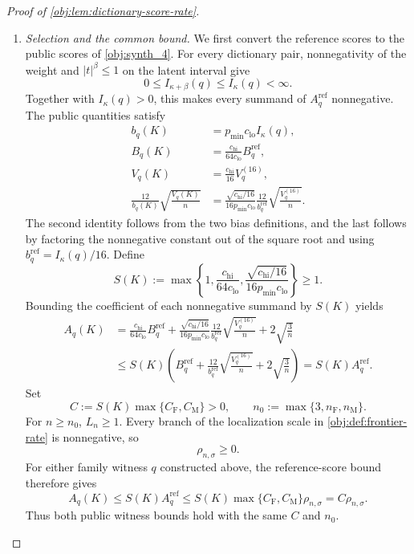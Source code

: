 \begin{proof}[Proof of \cref{obj:lem:dictionary-score-rate}]
\begin{enumerate}
\item \emph{Selection and the common bound.}
We first convert the reference scores to the public scores of \cref{obj:synth_4}. For every dictionary pair, nonnegativity of the weight and \(|t|^\beta\le1\) on the latent interval give
\[
0\le I_{\kappa+\beta}(q)\le I_\kappa(q)<\infty.
\]
Together with \(I_\kappa(q)>0\), this makes every summand of \(A_q^{\mathrm{ref}}\) nonnegative. The public quantities satisfy
\[
\begin{aligned}
b_q(K)&=p_{\min}c_{\mathrm{lo}}I_\kappa(q),\\
B_q(K)&=\frac{c_{\mathrm{hi}}}{64c_{\mathrm{lo}}}B_q^{\mathrm{ref}},\\
V_q(K)&=\frac{c_{\mathrm{hi}}}{16}V_q^{(16)},\\
\frac{12}{b_q(K)}\sqrt{\frac{V_q(K)}n}
&=\frac{\sqrt{c_{\mathrm{hi}}/16}}{16p_{\min}c_{\mathrm{lo}}}
\frac{12}{b_q^{\mathrm{ref}}}\sqrt{\frac{V_q^{(16)}}n}.
\end{aligned}
\]
The second identity follows from the two bias definitions, and the last follows by factoring the nonnegative constant out of the square root and using \(b_q^{\mathrm{ref}}=I_\kappa(q)/16\). Define
\[
S(K):=\max\left\{1,\frac{c_{\mathrm{hi}}}{64c_{\mathrm{lo}}},
\frac{\sqrt{c_{\mathrm{hi}}/16}}{16p_{\min}c_{\mathrm{lo}}}\right\}\ge1.
\]
Bounding the coefficient of each nonnegative summand by \(S(K)\) yields
\[
\begin{aligned}
A_q(K)
&=\frac{c_{\mathrm{hi}}}{64c_{\mathrm{lo}}}B_q^{\mathrm{ref}}
+\frac{\sqrt{c_{\mathrm{hi}}/16}}{16p_{\min}c_{\mathrm{lo}}}
\frac{12}{b_q^{\mathrm{ref}}}\sqrt{\frac{V_q^{(16)}}n}
+2\sqrt{\frac3n}\\
&\le S(K)\left(B_q^{\mathrm{ref}}
+\frac{12}{b_q^{\mathrm{ref}}}\sqrt{\frac{V_q^{(16)}}n}
+2\sqrt{\frac3n}\right)
=S(K)A_q^{\mathrm{ref}}.
\end{aligned}
\]
Set
\[
C:=S(K)\max\{C_{\mathrm F},C_{\mathrm M}\}>0,
\qquad
n_0:=\max\{3,n_{\mathrm F},n_{\mathrm M}\}.
\]
For \(n\ge n_0\), \(L_n\ge1\). Every branch of the localization scale in \cref{obj:def:frontier-rate} is nonnegative, so
\[
\rho_{n,\sigma}\ge0.
\]
For either family witness \(q\) constructed above, the reference-score bound therefore gives
\[
A_q(K)\le S(K)A_q^{\mathrm{ref}}
\le S(K)\max\{C_{\mathrm F},C_{\mathrm M}\}\rho_{n,\sigma}
=C\rho_{n,\sigma}.
\]
Thus both public witness bounds hold with the same \(C\) and \(n_0\).


\end{enumerate}
\end{proof}
